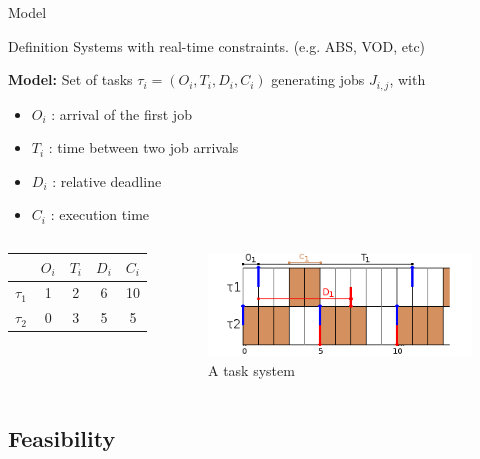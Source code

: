 \documentclass{beamer}
\begin{document}
	\begin{frame}{Model}
  \begin{block}{Definition}
  Systems with real-time constraints. (e.g. ABS, VOD, etc)
  \end{block}
  \textbf{Model:} Set of tasks $\tau_i = (O_i, T_i, D_i, C_i)$ generating jobs $J_{i,j}$, with
      \begin{itemize}
      \item $O_i$ : arrival of the first job
      \item $T_i$ : time between two job arrivals
      \item $D_i$ : relative deadline
      \item $C_i$ : execution time
    \end{itemize}

  \begin{columns}[c] %
\begin{center}
\begin{tabular}{|r|c|c|c|c|}
 \hline
  & $O_i$ & $T_i$ & $D_i$ & $C_i$ \\
 \hline
 $\tau_1$ & 1 & 2 & 6 & 10\\
 \hline
 $\tau_2$ & 0 & 3 & 5 & 5\\
 \hline
\end{tabular}
\end{center}

\begin{figure}[h]
\includegraphics[width=\textwidth]{figs/RTsystem_example.png}
\caption{A task system}
\label{fig:llf}
\end{figure}
  \end{columns}
\end{frame}

    \subsection{Feasibility}
\end{document}
